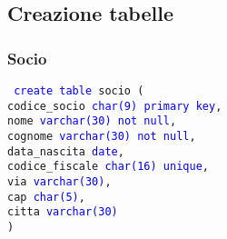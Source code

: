 \documentclass{article}
\begin{document}
\subsection{Creazione tabelle}
    
    \subsubsection{Socio}
    \begin{flushleft}
        \texttt{
        \textcolor{blue}{create table} socio ( \\
        \hspace*{2em} codice\_socio \hspace*{2em} \textcolor{blue}{char(9)} \hspace*{4em} \textcolor{blue}{primary key}, \\
        \hspace*{2em} nome \hspace*{5,9em} \textcolor{blue}{varchar(30)} \hspace*{2em} \textcolor{blue}{not null}, \\
        \hspace*{2em} cognome \hspace*{4,4em} \textcolor{blue}{varchar(30)} \hspace*{2em} \textcolor{blue}{not null}, \\
        \hspace*{2em} data\_nascita \hspace*{2,1em} \textcolor{blue}{date}, \\
        \hspace*{2em} codice\_fiscale \hspace*{1,1em} \textcolor{blue}{char(16)} \hspace*{3,4em} \textcolor{blue}{unique}, \\
        \hspace*{2em} via \hspace*{6,5em} \textcolor{blue}{varchar(30)}, \\
        \hspace*{2em} cap \hspace*{6,5em} \textcolor{blue}{char(5)}, \\
        \hspace*{2em} citta \hspace*{5,6em} \textcolor{blue}{varchar(30)} \\)}
    \end{flushleft}
\end{document}
